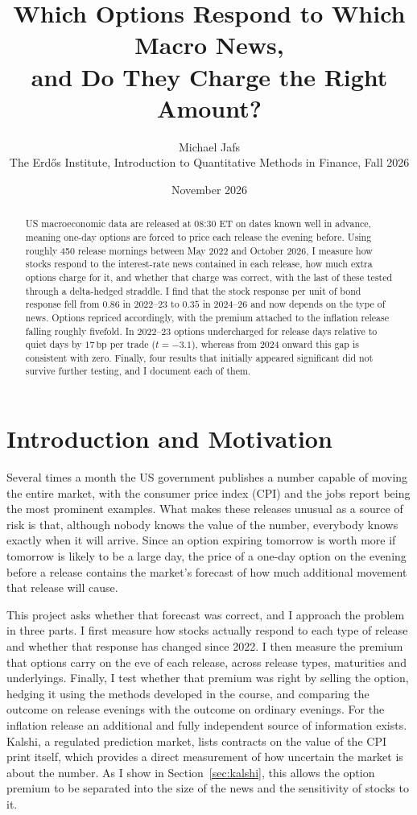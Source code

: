 \documentclass[10pt]{article}
\title{\vspace{-1.2cm}Which Options Respond to Which Macro News,\\ and Do They Charge the Right Amount?}
\author{Michael Jafs\\[2pt] \small The Erd\H{o}s Institute, Introduction to Quantitative Methods in Finance, Fall 2026}
\date{November 2026}
\newcommand{\bp}{\,\mathrm{bp}}
\begin{document}
\maketitle
\vspace{-0.6cm}

\begin{abstract}
\noindent US macroeconomic data are released at 08:30 ET on dates known well in advance, meaning one-day options are forced to price each release the evening before. Using roughly 450 release mornings between May 2022 and October 2026, I measure how stocks respond to the interest-rate news contained in each release, how much extra options charge for it, and whether that charge was correct, with the last of these tested through a delta-hedged straddle. I find that the stock response per unit of bond response fell from $0.86$ in 2022--23 to $0.35$ in 2024--26 and now depends on the type of news. Options repriced accordingly, with the premium attached to the inflation release falling roughly fivefold. In 2022--23 options undercharged for release days relative to quiet days by $17\bp$ per trade ($t=-3.1$), whereas from 2024 onward this gap is consistent with zero. Finally, four results that initially appeared significant did not survive further testing, and I document each of them.
\end{abstract}

\section{Introduction and Motivation}
Several times a month the US government publishes a number capable of moving the entire market, with the consumer price index (CPI) and the jobs report being the most prominent examples. What makes these releases unusual as a source of risk is that, although nobody knows the value of the number, everybody knows exactly when it will arrive. Since an option expiring tomorrow is worth more if tomorrow is likely to be a large day, the price of a one-day option on the evening before a release contains the market's forecast of how much additional movement that release will cause.

This project asks whether that forecast was correct, and I approach the problem in three parts. I first measure how stocks actually respond to each type of release and whether that response has changed since 2022. I then measure the premium that options carry on the eve of each release, across release types, maturities and underlyings. Finally, I test whether that premium was right by selling the option, hedging it using the methods developed in the course, and comparing the outcome on release evenings with the outcome on ordinary evenings. For the inflation release an additional and fully independent source of information exists. Kalshi, a regulated prediction market, lists contracts on the value of the CPI print itself, which provides a direct measurement of how uncertain the market is about the number. As I show in Section~\ref{sec:kalshi}, this allows the option premium to be separated into the size of the news and the sensitivity of stocks to it.
\end{document}
